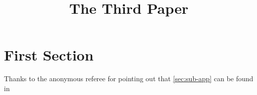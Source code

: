 \title{The Third Paper}
\maketitle
\label{pap:third}


\begin{abstract}
\end{abstract}

\section{First Section}


\begin{acknowledgements}
    Thanks to the anonymous referee for pointing out that \cref{sec:sub-app} can be found in %
\end{acknowledgements}

